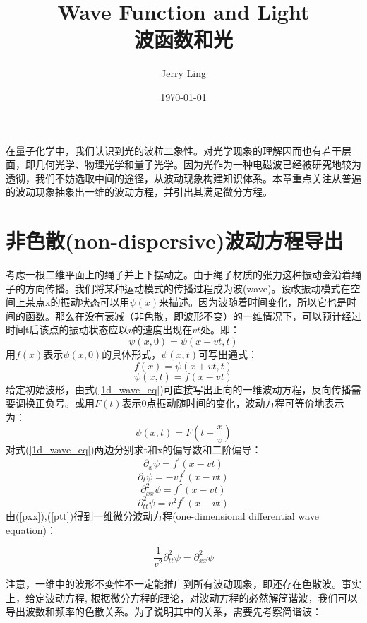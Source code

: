 \documentclass[12pt]{ctexart}%
\title{Wave Function and Light\\波函数和光}
\author{Jerry Ling}
\date{\today}
\begin{document}
\maketitle  %
在量子化学中，我们认识到光的波粒二象性。对光学现象的理解因而也有若干层面，即几何光学、物理光学和量子光学。因为光作为一种电磁波已经被研究地较为透彻，我们不妨选取中间的途径，从波动现象构建知识体系。本章重点关注从普遍的波动现象抽象出一维的波动方程，并引出其满足微分方程。

\section*{非色散(non-dispersive)波动方程导出}
考虑一根二维平面上的绳子并上下摆动之。由于绳子材质的张力这种振动会沿着绳子的方向传播。我们将某种运动模式的传播过程成为波(wave)。设改振动模式在空间上某点x的振动状态可以用$\psi(x)$来描述。因为波随着时间变化，所以它也是时间的函数。那么在没有衰减（非色散，即波形不变）的一维情况下，可以预计经过时间t后该点的振动状态应以$v$的速度出现在$vt$处。即：
\begin{equation}
    \psi(x,0)=\psi(x+vt,t)
\end{equation}
用$f(x)$表示$\psi(x,0)$的具体形式，$\psi(x,t)$可写出通式：
\begin{equation*}
    f(x)=\psi(x+vt,t)
\end{equation*}
\begin{equation}
    \psi(x,t)=f(x-vt)\label{1d_wave_eq}
\end{equation}
给定初始波形，由式(\ref{1d_wave_eq})可直接写出正向的一维波动方程，反向传播需要调换正负号。或用$F(t)$表示0点振动随时间的变化，波动方程可等价地表示为：
\begin{equation}
    \psi(x,t)=F(t-\frac{x}{v})\label{1d_wave_eq2}
\end{equation}
对式(\ref{1d_wave_eq})两边分别求t和x的偏导数和二阶偏导：
\begin{equation}
    \partial_{x} \psi=f^{'}(x-vt)
\end{equation}
\begin{equation}
    \partial_{t}\psi=-v f^{'}(x-vt)
\end{equation}
\begin{equation}
    \partial^2_{xx}\psi=f^{''}(x-vt)\label{pxx}
\end{equation}
\begin{equation}
    \partial^2_{tt}\psi=v^2f^{''}(x-vt)\label{ptt}
\end{equation}
由(\ref{pxx}),(\ref{ptt})得到一维微分波动方程(one-dimensional differential wave equation)：
\begin{framed}
    \begin{equation}   
        \frac{1}{v^2}\partial^2_{tt}\psi=\partial^2_{xx}\psi 
        \label{we1}
    \end{equation}
\end{framed}
注意，一维中的波形不变性不一定能推广到所有波动现象，即还存在色散波。事实上，给定波动方程, 根据微分方程的理论，对波动方程的必然解简谐波，我们可以导出波数和频率的色散关系。为了说明其中的关系，需要先考察简谐波：
\end{document}
